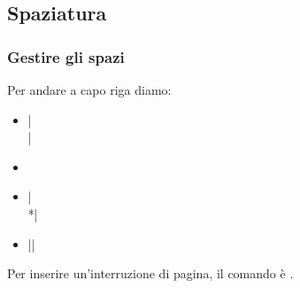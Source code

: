 \subsection{Spaziatura}


\begin{frame}
 \frametitle{Gestire gli spazi}
 
  Per andare a capo riga diamo:
  \begin{itemize}
    \item {} |\\|
    \item \inline{\hfill \break}
    \item {} |\\*|
    \item {} |\newline|
  \end{itemize}
  \vspace{5mm}
  Per inserire un'interruzione di pagina, il comando è \texttt{\newline}.
 
 
 
\end{frame}
